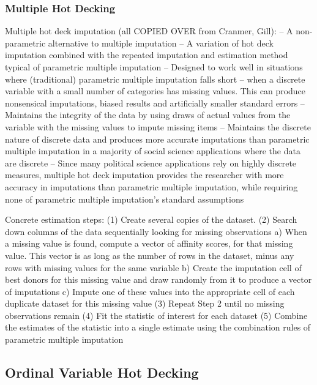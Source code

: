 \documentclass[12pt,econ]{sources/authesis}
\begin{document}
\hypertarget{ordmiss-theory-impute-multhot}{%
\subsubsection{Multiple Hot Decking}\label{ordmiss-theory-impute-multhot}}

Multiple hot deck imputation (all COPIED OVER from Cranmer, Gill):
-- A non-parametric alternative to multiple imputation
-- A variation of hot deck imputation combined with the repeated imputation and estimation method typical of parametric multiple imputation
-- Designed to work well in situations where (traditional) parametric multiple imputation falls short -- when a discrete variable with a small number of categories has missing values. This can produce nonsensical imputations, biased results and artificially smaller standard errors
-- Maintains the integrity of the data by using draws of actual values from the variable with the missing values to impute missing items
-- Maintains the discrete nature of discrete data and produces more accurate imputations than parametric multiple imputation in a majority of social science applications where the data are discrete
-- Since many political science applications rely on highly discrete measures, multiple hot deck imputation provides the researcher with more accuracy in imputations than parametric multiple imputation, while requiring none of parametric multiple imputation's standard assumptions

Concrete estimation steps:
(1) Create several copies of the dataset.
(2) Search down columns of the data sequentially looking for missing observations
a) When a missing value is found, compute a vector of affinity scores, for that missing value. This vector is as long as the number of rows in the dataset, minus any rows with missing values for the same variable
b) Create the imputation cell of best donors for this missing value and draw randomly from it to produce a vector of imputations
c) Impute one of these values into the appropriate cell of each duplicate dataset for this missing value
(3) Repeat Step 2 until no missing observations remain
(4) Fit the statistic of interest for each dataset
(5) Combine the estimates of the statistic into a single estimate using the combination rules of parametric multiple imputation

\hypertarget{ordmiss-theory-ordhot}{%
\subsection{Ordinal Variable Hot Decking}\label{ordmiss-theory-ordhot}}
\end{document}
